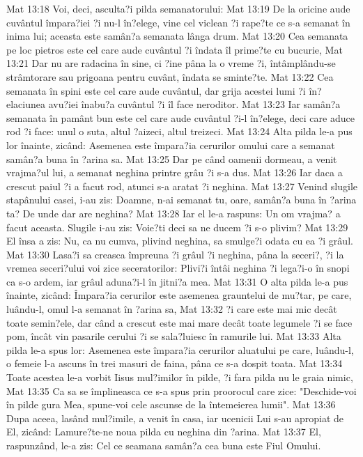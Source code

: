 Mat 13:18  Voi, deci, asculta?i pilda semanatorului:
Mat 13:19  De la oricine aude cuvântul împara?iei ?i nu-l în?elege, vine cel viclean ?i rape?te ce s-a semanat în inima lui; aceasta este samân?a semanata lânga drum.
Mat 13:20  Cea semanata pe loc pietros este cel care aude cuvântul ?i îndata îl prime?te cu bucurie,
Mat 13:21  Dar nu are radacina în sine, ci ?ine pâna la o vreme ?i, întâmplându-se strâmtorare sau prigoana pentru cuvânt, îndata se sminte?te.
Mat 13:22  Cea semanata în spini este cel care aude cuvântul, dar grija acestei lumi ?i în?elaciunea avu?iei înabu?a cuvântul ?i îl face neroditor.
Mat 13:23  Iar samân?a semanata în pamânt bun este cel care aude cuvântul ?i-l în?elege, deci care aduce rod ?i face: unul o suta, altul ?aizeci, altul treizeci.
Mat 13:24  Alta pilda le-a pus lor înainte, zicând: Asemenea este împara?ia cerurilor omului care a semanat samân?a buna în ?arina sa.
Mat 13:25  Dar pe când oamenii dormeau, a venit vrajma?ul lui, a semanat neghina printre grâu ?i s-a dus.
Mat 13:26  Iar daca a crescut paiul ?i a facut rod, atunci s-a aratat ?i neghina.
Mat 13:27  Venind slugile stapânului casei, i-au zis: Doamne, n-ai semanat tu, oare, samân?a buna în ?arina ta? De unde dar are neghina?
Mat 13:28  Iar el le-a raspuns: Un om vrajma? a facut aceasta. Slugile i-au zis: Voie?ti deci sa ne ducem ?i s-o plivim?
Mat 13:29  El însa a zis: Nu, ca nu cumva, plivind neghina, sa smulge?i odata cu ea ?i grâul.
Mat 13:30  Lasa?i sa creasca împreuna ?i grâul ?i neghina, pâna la seceri?, ?i la vremea seceri?ului voi zice seceratorilor: Plivi?i întâi neghina ?i lega?i-o în snopi ca s-o ardem, iar grâul aduna?i-l în jitni?a mea.
Mat 13:31  O alta pilda le-a pus înainte, zicând: Împara?ia cerurilor este asemenea grauntelui de mu?tar, pe care, luându-l, omul l-a semanat în ?arina sa,
Mat 13:32  ?i care este mai mic decât toate semin?ele, dar când a crescut este mai mare decât toate legumele ?i se face pom, încât vin pasarile cerului ?i se sala?luiesc în ramurile lui.
Mat 13:33  Alta pilda le-a spus lor: Asemenea este împara?ia cerurilor aluatului pe care, luându-l, o femeie l-a ascuns în trei masuri de faina, pâna ce s-a dospit toata.
Mat 13:34  Toate acestea le-a vorbit Iisus mul?imilor în pilde, ?i fara pilda nu le graia nimic,
Mat 13:35  Ca sa se împlineasca ce s-a spus prin proorocul care zice: "Deschide-voi în pilde gura Mea, spune-voi cele ascunse de la întemeierea lumii".
Mat 13:36  Dupa aceea, lasând mul?imile, a venit în casa, iar ucenicii Lui s-au apropiat de El, zicând: Lamure?te-ne noua pilda cu neghina din ?arina.
Mat 13:37  El, raspunzând, le-a zis: Cel ce seamana samân?a cea buna este Fiul Omului.
